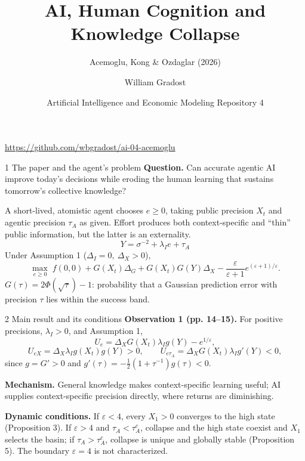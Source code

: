 \documentclass[aspectratio=169,11pt]{beamer}
\title{AI, Human Cognition and Knowledge Collapse}
\subtitle{Acemoglu, Kong \& Ozdaglar (2026)}
\author{William Gradost}
\date{Artificial Intelligence and Economic Modeling \textperiodcentered{} Repository 4}
\begin{document}
\begin{frame}[plain]
  \titlepage
  \begin{center}\small
    \url{https://github.com/wbgradost/ai-04-acemoglu}
  \end{center}
\end{frame}

\begin{frame}{1 \textperiodcentered{} The paper and the agent's problem}
  \textbf{Question.} Can accurate agentic AI improve today's decisions while
  eroding the human learning that sustains tomorrow's collective knowledge?

  \smallskip
  A short-lived, atomistic agent chooses \(e\geq0\), taking public precision
  \(X_t\) and agentic precision \(\tau_A\) as given. Effort produces both
  context-specific and ``thin'' public information, but the latter is an
  externality.
  \[
    Y=\sigma^{-2}+\lambda_Ie+\tau_A \tag{4}
  \]
  Under Assumption 1 (\(\Delta_I=0,\ \Delta_X>0\)),
  \[
  \max_{e\geq0}\;
  f(0,0)+G(X_t)\Delta_G+G(X_t)G(Y)\Delta_X
  -\frac{\varepsilon}{\varepsilon+1}e^{(\varepsilon+1)/\varepsilon}. \tag{6}
  \]
  \footnotesize\(G(\tau)=2\Phi(\sqrt\tau)-1\): probability that a Gaussian
  prediction error with precision \(\tau\) lies within the success band.
\end{frame}

\begin{frame}{2 \textperiodcentered{} Main result and its conditions}
  \textbf{Observation 1 (pp. 14--15).} For positive precisions, \(\lambda_I>0\),
  and Assumption 1,
  \[
  U_e=\Delta_XG(X_t)\lambda_Ig(Y)-e^{1/\varepsilon},
  \]
  \[
  U_{eX}=\Delta_X\lambda_Ig(X_t)g(Y)>0,\qquad
  U_{e\tau_A}=\Delta_XG(X_t)\lambda_Ig'(Y)<0,
  \]
  since \(g=G'>0\) and
  \(g'(\tau)=-\tfrac12(1+\tau^{-1})g(\tau)<0\).

  \smallskip
  \textbf{Mechanism.} General knowledge makes context-specific learning useful;
  AI supplies context-specific precision directly, where returns are diminishing.

  \smallskip
  \textbf{Dynamic conditions.} If \(\varepsilon<4\), every \(X_1>0\) converges
  to the high state (Proposition 3). If \(\varepsilon>4\) and
  \(\tau_A<\tau_A^c\), collapse and the high state coexist and \(X_1\) selects
  the basin; if \(\tau_A>\tau_A^c\), collapse is unique and globally stable
  (Proposition 5). The boundary \(\varepsilon=4\) is not characterized.
\end{frame}
\end{document}
